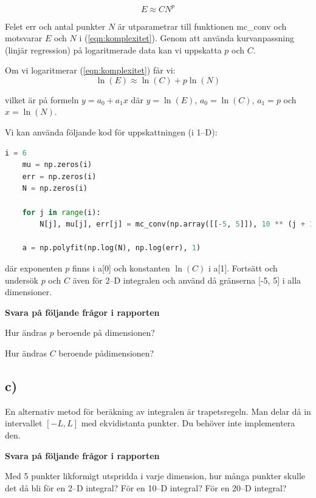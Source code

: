 \documentclass[a4paper]{article}
\begin{document}
\begin{equation} \label{eqn:komplexitet}
    E \approx CN^p
\end{equation}

Felet err och antal punkter \( N \)  är utparametrar till funktionen mc\_conv
och motsvarar \(E\)  och \(N\) i (\ref{eqn:komplexitet}).
Genom att använda kurvanpassning (linjär regression) på logaritmerade data kan vi uppskatta \(p\) och \(C\).

Om vi logaritmerar (\ref{eqn:komplexitet}) får vi:
\begin{equation} \label{eqn:loggad}
    \ln (E) \approx \ln (C) +p \ln (N)
\end{equation}

vilket är på formeln \(y=a_0+a_1x\) där \(y=\ln(E)\), \(a_0=\ln(C)\), \(a_1=p\) och \(x=\ln(N)\).


Vi kan använda följande kod för uppskattningen (i 1--D):

\begin{lstlisting}[language=Python]
    i = 6
    mu = np.zeros(i)
    err = np.zeros(i)
    N = np.zeros(i)

    for j in range(i):
        N[j], mu[j], err[j] = mc_conv(np.array([[-5, 5]]), 10 ** (j + 1))

    a = np.polyfit(np.log(N), np.log(err), 1)
\end{lstlisting}

där exponenten \(p\) finns i a[0] och konstanten \( \ln (C) \) i a[1].
Fortsätt och undersök \( p \)  och \( C \)  även för 2--D integralen och
använd då gränserna [-5, 5] i alla dimensioner.

\textbf{Svara på följande frågor i rapporten}

Hur ändras \( p \) beroende på dimensionen?

Hur ändras \( C \) beroende pådimensionen?

\subsection{c)}
En alternativ metod för beräkning av integralen är trapetsregeln.
Man delar då in intervallet \([-L, L]\) med ekvidistanta punkter.
Du behöver inte implementera den.

\textbf{Svara på följande frågor i rapporten}

Med 5 punkter likformigt utspridda i varje dimension, hur många punkter skulle
det då bli för en 2--D integral? För en 10--D integral? För en 20--D integral?
\end{document}
